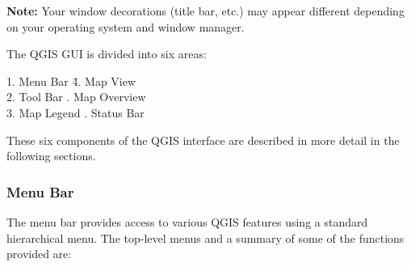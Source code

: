 \textbf{Note:} Your window decorations (title bar, etc.) may appear
different depending on your operating system and window manager.

The QGIS GUI is divided into six areas:

\begin{tabbing}
1. Menu Bar \hspace{3cm}\= 4. Map View \\
2. Tool Bar \hspace{3cm}. Map Overview  \\
3. Map Legend \hspace{3cm}. Status Bar   
\end{tabbing}

These six components of the QGIS interface are described in more detail in
the following sections.

\subsubsection{Menu Bar}\label{label_menubar}

The menu bar provides access to various QGIS features using a standard 
hierarchical menu. The top-level menus and a summary of some of the
functions provided are:

